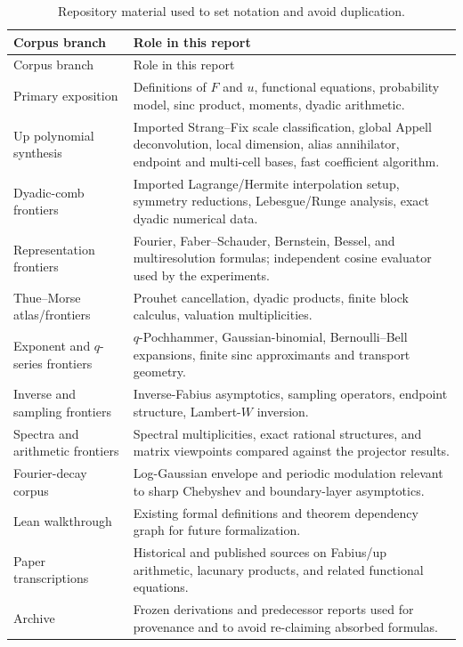 \documentclass[11pt,oneside]{article}
\numberwithin{equation}{section}
\theoremstyle{definition}
\theoremstyle{remark}
\begin{document}
\begin{longtable}{@{}p{}p{}@{}}
\caption{Repository material used to set notation and avoid duplication.}
\label{tab:crosswalk}\\
\toprule
Corpus branch & Role in this report \\
\midrule
\endfirsthead
\toprule
Corpus branch & Role in this report \\
\midrule
\endhead
Primary exposition & Definitions of $F$ and $u$, functional equations,
probability model, sinc product, moments, dyadic arithmetic. \\
Up polynomial synthesis & Imported Strang--Fix scale classification, global
Appell deconvolution, local dimension, alias annihilator, endpoint and
multi-cell bases, fast coefficient algorithm. \\
Dyadic-comb frontiers & Imported Lagrange/Hermite interpolation setup,
symmetry reductions, Lebesgue/Runge analysis, exact dyadic numerical data. \\
Representation frontiers & Fourier, Faber--Schauder, Bernstein, Bessel, and
multiresolution formulas; independent cosine evaluator used by the
experiments. \\
Thue--Morse atlas/frontiers & Prouhet cancellation, dyadic products, finite
block calculus, valuation multiplicities. \\
Exponent and $q$-series frontiers & $q$-Pochhammer, Gaussian-binomial,
Bernoulli--Bell expansions, finite sinc approximants and transport geometry. \\
Inverse and sampling frontiers & Inverse-Fabius asymptotics, sampling
operators, endpoint structure, Lambert-$W$ inversion. \\
Spectra and arithmetic frontiers & Spectral multiplicities, exact rational
structures, and matrix viewpoints compared against the projector results. \\
Fourier-decay corpus & Log-Gaussian envelope and periodic modulation relevant
to sharp Chebyshev and boundary-layer asymptotics. \\
Lean walkthrough & Existing formal definitions and theorem dependency graph
for future formalization. \\
Paper transcriptions & Historical and published sources on Fabius/up
arithmetic, lacunary products, and related functional equations. \\
Archive & Frozen derivations and predecessor reports used for provenance and
to avoid re-claiming absorbed formulas. \\
\bottomrule
\end{longtable}
\end{document}
